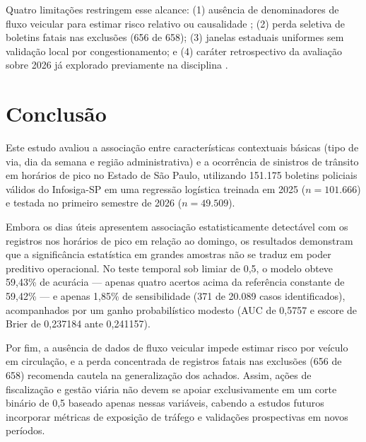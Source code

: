 \documentclass[
  article,
  12pt,
  oneside,
  a4paper,
  section=TITLE,
  english,
  brazil
]{abntex2}\usepackage[]{graphicx}\usepackage[]{xcolor}
\begin{document}
Quatro limitações restringem esse alcance: (1) ausência de denominadores de fluxo veicular para estimar risco relativo ou causalidade \parencite{who2010}; (2) perda seletiva de boletins fatais nas exclusões (656 de 658); (3) janelas estaduais uniformes sem validação local por congestionamento; e (4) caráter retrospectivo da avaliação sobre 2026 já explorado previamente na disciplina \parencite{lones2024,kapoor2024}.

\section{Conclusão}

Este estudo avaliou a associação entre características contextuais básicas (tipo de via, dia da semana e região administrativa) e a ocorrência de sinistros de trânsito em horários de pico no Estado de São Paulo, utilizando 151.175 boletins policiais válidos do Infosiga-SP em uma regressão logística treinada em 2025 ($n = 101.666$) e testada no primeiro semestre de 2026 ($n = 49.509$).

Embora os dias úteis apresentem associação estatisticamente detectável com os registros nos horários de pico em relação ao domingo, os resultados demonstram que a significância estatística em grandes amostras não se traduz em poder preditivo operacional. No teste temporal sob limiar de 0,5, o modelo obteve 59,43\% de acurácia --- apenas quatro acertos acima da referência constante de 59,42\% --- e apenas 1,85\% de sensibilidade (371 de 20.089 casos identificados), acompanhados por um ganho probabilístico modesto (AUC de 0,5757 e escore de Brier de 0,237184 ante 0,241157).

Por fim, a ausência de dados de fluxo veicular impede estimar risco por veículo em circulação, e a perda concentrada de registros fatais nas exclusões (656 de 658) recomenda cautela na generalização dos achados. Assim, ações de fiscalização e gestão viária não devem se apoiar exclusivamente em um corte binário de 0,5 baseado apenas nessas variáveis, cabendo a estudos futuros incorporar métricas de exposição de tráfego e validações prospectivas em novos períodos.

\postextual
\printbibliography[title={REFERÊNCIAS}]
\end{document}

